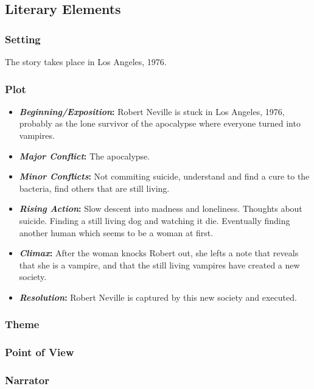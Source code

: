\subsection{Literary Elements}

\subsubsection{Setting}

The story takes place in Los Angeles, 1976.

\subsubsection{Plot}

\begin{itemize}
	\item \textbf{\textit{Beginning/Exposition}:} Robert Neville is stuck in Los Angeles, 1976, probably as the lone survivor of the apocalypse where everyone turned into vampires.
	\item \textbf{\textit{Major Conflict}:} The apocalypse.
	\item \textbf{\textit{Minor Conflicts}:} Not commiting suicide, understand and find a cure to the bacteria, find others that are still living.
	\item \textbf{\textit{Rising Action}:} Slow descent into madness and loneliness. Thoughts about suicide. Finding a still living dog and watching it die. Eventually finding another human which seems to be a woman at first.
	\item \textbf{\textit{Climax}:} After the woman knocks Robert out, she lefts a note that reveals that she is a vampire, and that the still living vampires have created a new society. 
	\item \textbf{\textit{Resolution}:} Robert Neville is captured by this new society and executed.
\end{itemize}

\subsubsection{Theme}



\subsubsection{Point of View}

\subsubsection{Narrator}

